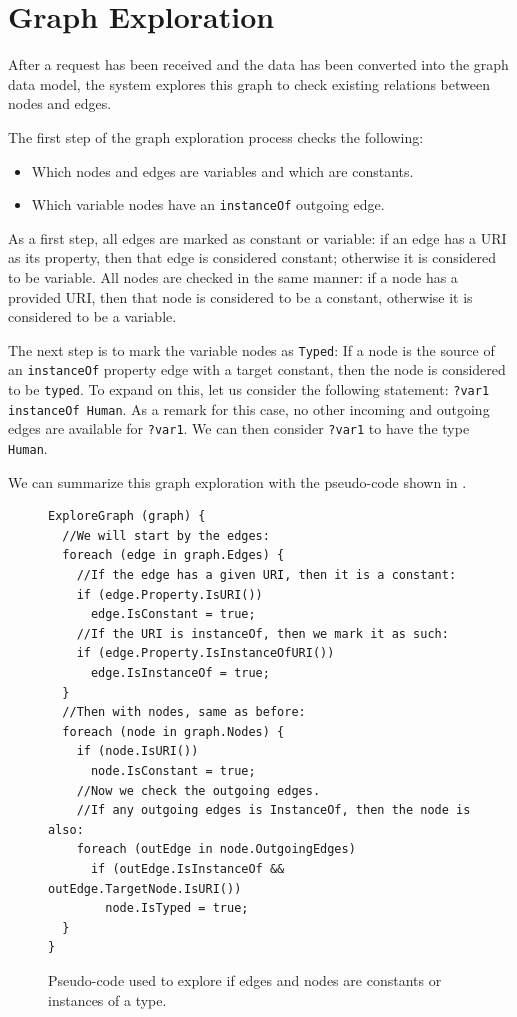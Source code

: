 
\section{Graph Exploration}
\label{chap:graph_exploration}

After a request has been received and the data has been converted into the graph data model, the system explores this graph to check existing relations between nodes and edges. 

The first step of the graph exploration process checks the following:
\begin{itemize}
    \item Which nodes and edges are variables and which are constants.
    \item Which variable nodes have an \texttt{instanceOf} outgoing edge.
\end{itemize}

As a first step, all edges are marked as constant or variable: 
if an edge has a URI as its property, then that edge is considered constant; otherwise it is considered to be variable. 
All nodes are checked in the same manner: if a node has a provided URI, then that node is considered to be a constant, otherwise it is considered to be a variable. 

The next step is to mark the variable nodes as \texttt{Typed}:
If a node is the source of an \texttt{instanceOf} property edge with a target constant, then the node is considered to be \texttt{typed}. To expand on this, let us consider the following statement: \texttt{?var1 instanceOf Human}. As a remark for this case, no other incoming and outgoing edges are available for \texttt{?var1}. We can then consider \texttt{?var1} to have the type \texttt{Human}.

We can summarize this graph exploration with the pseudo-code shown in .
\begin{figure}[H]
\begin{verbatim}
ExploreGraph (graph) {
  //We will start by the edges:
  foreach (edge in graph.Edges) {
    //If the edge has a given URI, then it is a constant:
    if (edge.Property.IsURI())
      edge.IsConstant = true;
    //If the URI is instanceOf, then we mark it as such:
    if (edge.Property.IsInstanceOfURI())
      edge.IsInstanceOf = true;
  }
  //Then with nodes, same as before:
  foreach (node in graph.Nodes) {
    if (node.IsURI())
      node.IsConstant = true;
    //Now we check the outgoing edges.
    //If any outgoing edges is InstanceOf, then the node is also:
    foreach (outEdge in node.OutgoingEdges)
      if (outEdge.IsInstanceOf && outEdge.TargetNode.IsURI())
        node.IsTyped = true;
  }
}
\end{verbatim}
\caption{Pseudo-code used to explore if edges and nodes are constants or instances of a type.}
\label{fig:codeExploration}
\end{figure}

